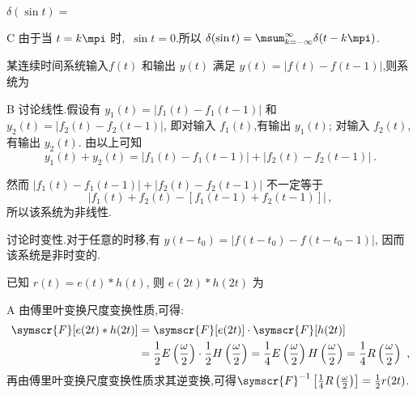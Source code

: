 \documentclass[list,answers,csize4,custom]{sysuexam}
\begin{document}

\begin{groups}
\begin{questions}[rs]
    \question[5] $\delta(\sin t)=$\kh
    \begin{solution}
        \answer C
        \analysis 由于当 $t=k \mpi$ 时,~$\sin t=0$.所以 $\delta(\sin t)=\msum_{k=-\infty}^{\infty} \delta(t-k \mpi)$.
    \end{solution}

    \question[5] 某连续时间系统输入$f(t)$ 和输出 $y(t)$ 满足 $y(t)=|f(t)-f(t-1)|$,则系统为\kh
    \begin{solution}
        \answer B
        \analysis 讨论线性.假设有 $y_{1}(t)=\left|f_{1}(t)-f_{1}(t-1)\right|$ 和 $y_{2}(t)=\left|f_{2}(t)-f_{2}(t-1)\right|$, 即对输入 $f_{1}(t)$,有输出 $y_{1}(t) $; 对输入 $f_{2}(t)$, 有输出 $y_{2}(t) $. 由以上可知$$
        y_{1}(t)+y_{2}(t)=\left|f_{1}(t)-f_{1}(t-1)\right|+\left|f_{2}(t)-f_{2}(t-1)\right|\ .
        $$

        \sj 然而 $\left|f_{1}(t)-f_{1}(t-1)\right|+\left|f_{2}(t)-f_{2}(t-1)\right|$ 不一定等于
        $$\left| f_{1}(t)+f_{2}(t)-\left[f_{1}(t-1)+f_{2}(t-1)\right]\right|\,,$$所以该系统为非线性.

        \sj 讨论时变性.对于任意的时移,有 $y\left(t-t_{0}\right)=\left|f\left(t-t_{0}\right)-f\left(t-t_{0}-1\right)\right|$, 因而该系统是非时变的.
    \end{solution}

    \question[5] 已知 $r(t)=e(t) * h(t)$, 则 $e(2 t) * h(2 t)$ 为\kh
    \begin{solution}
        \answer A
        \analysis 由傅里叶变换尺度变换性质,可得:$$
        \begin{aligned}
        \symscr{F}[e(2 t) * h(2 t)]&=\symscr{F}[e(2 t)] \cdot \symscr{F}[h(2 t)]\\
        &=\frac{1}{2} E\left(\frac{\omega}{2}\right) \cdot \frac{1}{2} H\left(\frac{\omega}{2}\right)=\frac{1}{4} E\left(\frac{\omega}{2}\right) H\left(\frac{\omega}{2}\right)=\frac{1}{4} R\left(\frac{\omega}{2}\right)\ ,
        \end{aligned}$$
        再由傅里叶变换尺度变换性质求其逆变换,可得$\symscr{F}^{-1}\left[\frac{1}{4} R\left(\frac{\omega}{2}\right)\right]=\frac{1}{2} r(2 t)$.
    \end{solution}


\end{questions}
\end{groups}
\end{document}
